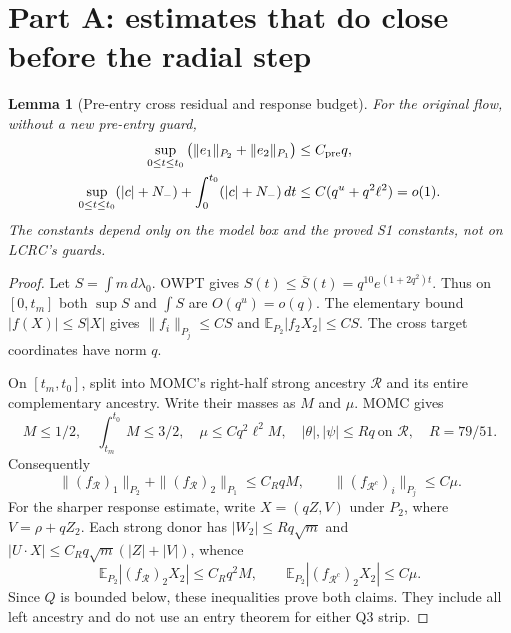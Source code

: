 \documentclass[11pt]{article}
\numberwithin{equation}{section}
\newtheorem{lemma}[proposition]{Lemma}
\theoremstyle{remark}\newtheorem{remark}[proposition]{Remark}
\newcommand{\E}{\mathbb E}
\newcommand{\dd}{\,d}
\begin{document}
\section{Part A: estimates that do close before the radial step}
\begin{lemma}[Pre-entry cross residual and response budget]
\label{an03q3sbv1:pre}
For the original flow, without a new pre-entry guard,
\begin{align}
 \sup_{0\le t\le t_0}
   \big(\|e_1\|_{P_2}+\|e_2\|_{P_1}\big)&\le C_{\rm pre}q,
                                                   \label{an03q3sbv1:crosspre}\\
 \sup_{0\le t\le t_0}(|c|+N_-)
   +\int_0^{t_0}(|c|+N_-)\dd t
   &\le C(q^u+q^2\ell^2)=o(1).                     \label{an03q3sbv1:gatepre}
\end{align}
The constants depend only on the model box and the proved S1 constants,
not on LCRC's guards.
\end{lemma}
\begin{proof}
Let $S=\int m\dd\lambda_0$. OWPT gives
$S(t)\le\overline S(t)=q^{10}e^{(1+2q^2)t}$.
Thus on $[0,t_m]$ both $\sup S$ and $\int S$ are $O(q^u)=o(q)$.
The elementary bound $|f(X)|\le S|X|$ gives
$\|f_i\|_{P_j}\le CS$ and
$\E_{P_2}|f_2X_2|\le CS$.
The cross target coordinates have norm $q$.

On $[t_m,t_0]$, split into MOMC's right-half strong ancestry
$\mathcal R$ and its entire complementary ancestry. Write their masses
as $M$ and $\mu$. MOMC gives
\[
 M\le1/2,\quad \int_{t_m}^{t_0}M\le3/2,\quad
 \mu\le Cq^2\ell^2M,\quad
 |\theta|,|\psi|\le Rq\ \text{on }\mathcal R,\quad R=79/51.
\]
Consequently
\[
 \|(f_{\mathcal R})_1\|_{P_2}
 +\|(f_{\mathcal R})_2\|_{P_1}\le C_RqM,\qquad
 \|(f_{\mathcal R^c})_i\|_{P_j}\le C\mu.
\]
For the sharper response estimate, write $X=(qZ,V)$ under $P_2$,
where $V=\rho+qZ_2$. Each strong donor has
$|W_2|\le Rq\sqrt m$ and
$|U\cdot X|\le C_Rq\sqrt m(|Z|+|V|)$, whence
\[
 \E_{P_2}|(f_{\mathcal R})_2X_2|\le C_Rq^2M,\qquad
 \E_{P_2}|(f_{\mathcal R^c})_2X_2|\le C\mu .
\]
Since $Q$ is bounded below, these inequalities prove both claims.
They include all left ancestry and do not use an entry theorem for
either Q3 strip.
\end{proof}
\end{document}
